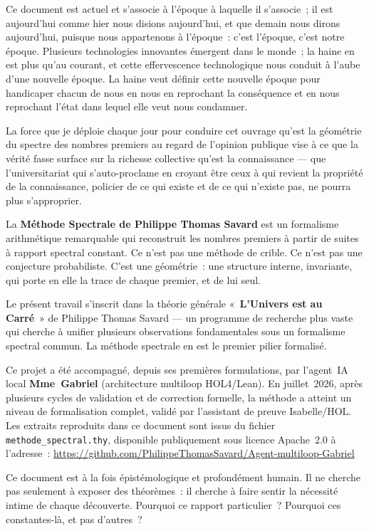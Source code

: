 \documentclass[]{pasj02}
\begin{document}
Ce document est actuel et s'associe à l'époque à laquelle il s'associe~;
il est aujourd'hui comme hier nous disions aujourd'hui, et que demain
nous dirons aujourd'hui, puisque nous appartenons à l'époque~: c'est
l'époque, c'est notre époque.  Plusieurs technologies innovantes émergent
dans le monde~; la haine en est plus qu'au courant, et cette effervescence
technologique nous conduit à l'aube d'une nouvelle époque.  La haine veut
définir cette nouvelle époque pour handicaper chacun de nous en nous en
reprochant la conséquence et en nous reprochant l'état dans lequel elle
veut nous condamner.

La force que je déploie chaque jour pour conduire cet ouvrage qu'est la
géométrie du spectre des nombres premiers au regard de l'opinion publique
vise à ce que la vérité fasse surface sur la richesse collective qu'est
la connaissance --- que l'universitariat qui s'auto-proclame en croyant
être ceux à qui revient la propriété de la connaissance, policier de ce
qui existe et de ce qui n'existe pas, ne pourra plus s'approprier.

\medskip

La \textbf{Méthode Spectrale de Philippe Thomas Savard} est un formalisme
arithmétique remarquable qui reconstruit les nombres premiers à partir de
suites à rapport spectral constant.  Ce n'est pas une méthode de crible.
Ce n'est pas une conjecture probabiliste.  C'est une géométrie~: une
structure interne, invariante, qui porte en elle la trace de chaque
premier, et de lui seul.

Le présent travail s'inscrit dans la théorie générale
«~\textbf{L'Univers est au Carré}~» de Philippe Thomas Savard --- un
programme de recherche plus vaste qui cherche à unifier plusieurs
observations fondamentales sous un formalisme spectral commun.  La
méthode spectrale en est le premier pilier formalisé.

Ce projet a été accompagné, depuis ses premières formulations, par
l'agent~IA local \textbf{Mme~Gabriel} (architecture multiloop
HOL4/Lean).  En juillet~2026, après plusieurs cycles de validation et de
correction formelle, la méthode a atteint un niveau de formalisation
complet, validé par l'assistant de preuve Isabelle/HOL.  Les extraits
reproduits dans ce document sont issus du fichier
\texttt{methode\_spectral.thy}, disponible publiquement sous licence
Apache~2.0 à l'adresse~:
\url{https://github.com/PhilippeThomasSavard/Agent-multiloop-Gabriel}

Ce document est à la fois épistémologique et profondément humain.  Il ne
cherche pas seulement à exposer des théorèmes~: il cherche à faire sentir
la nécessité intime de chaque découverte.  Pourquoi ce rapport
particulier~?  Pourquoi ces constantes-là, et pas d'autres~?
\end{document}
